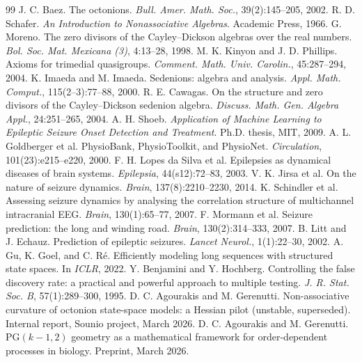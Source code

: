 \documentclass[11pt,twocolumn]{article}
\begin{document}
\begin{thebibliography}{99}
 J. C. Baez.
 The octonions.
 \emph{Bull. Amer. Math. Soc.}, 39(2):145--205, 2002.
 R. D. Schafer.
 \emph{An Introduction to Nonassociative Algebras}.
 Academic Press, 1966.
 G. Moreno.
 The zero divisors of the Cayley--Dickson algebras over the real
 numbers.
 \emph{Bol. Soc. Mat. Mexicana (3)}, 4:13--28, 1998.
 M. K. Kinyon and J. D. Phillips.
 Axioms for trimedial quasigroups.
 \emph{Comment. Math. Univ. Carolin.}, 45:287--294, 2004.
 K. Imaeda and M. Imaeda.
 Sedenions: algebra and analysis.
 \emph{Appl. Math. Comput.}, 115(2--3):77--88, 2000.
 R. E. Cawagas.
 On the structure and zero divisors of the Cayley--Dickson
 sedenion algebra.
 \emph{Discuss. Math. Gen. Algebra Appl.}, 24:251--265, 2004.
 A. H. Shoeb.
 \emph{Application of Machine Learning to Epileptic Seizure
 Onset Detection and Treatment}.
 Ph.D. thesis, MIT, 2009.
 A. L. Goldberger et al.
 PhysioBank, PhysioToolkit, and PhysioNet.
 \emph{Circulation}, 101(23):e215--e220, 2000.
 F. H. Lopes da Silva et al.
 Epilepsies as dynamical diseases of brain systems.
 \emph{Epilepsia}, 44(s12):72--83, 2003.
 V. K. Jirsa et al.
 On the nature of seizure dynamics.
 \emph{Brain}, 137(8):2210--2230, 2014.
 K. Schindler et al.
 Assessing seizure dynamics by analysing the correlation
 structure of multichannel intracranial EEG.
 \emph{Brain}, 130(1):65--77, 2007.
 F. Mormann et al.
 Seizure prediction: the long and winding road.
 \emph{Brain}, 130(2):314--333, 2007.
 B. Litt and J. Echauz.
 Prediction of epileptic seizures.
 \emph{Lancet Neurol.}, 1(1):22--30, 2002.
 A. Gu, K. Goel, and C. R\'e.
 Efficiently modeling long sequences with structured state
 spaces.
 In \emph{ICLR}, 2022.
 Y. Benjamini and Y. Hochberg.
 Controlling the false discovery rate: a practical and
 powerful approach to multiple testing.
 \emph{J. R. Stat. Soc. B}, 57(1):289--300, 1995.
 D. C. Agourakis and M. Gerenutti.
 Non-associative curvature of octonion state-space models:
 a Hessian pilot (unstable, superseded).
 Internal report, Sounio project, March 2026.
 D. C. Agourakis and M. Gerenutti.
 $\mathrm{PG}(k-1,2)$ geometry as a mathematical framework for
 order-dependent processes in biology.
 Preprint, March 2026.
\end{thebibliography}
\end{document}
